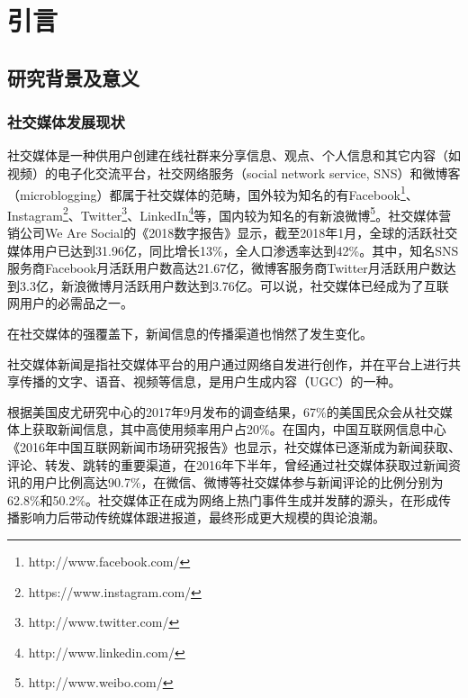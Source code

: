 \documentclass[a4paper,oneside,12pt]{book}
\begin{document}
  
\newpage

 
\newpage

\frontmatter\tableofcontents %

\newpage\mainmatter
{} %
\pagestyle{fancy} %


\chapter{引言}
\section{研究背景及意义}
\subsection{社交媒体发展现状}
社交媒体是一种供用户创建在线社群来分享信息、观点、个人信息和其它内容（如视频）的电子化交流平台，社交网络服务（social network service, SNS）和微博客（microblogging）都属于社交媒体的范畴\cite{webster_social_media}，国外较为知名的有Facebook\footnote{http://www.facebook.com/}、Instagram\footnote{https://www.instagram.com/}、Twitter\footnote{http://www.twitter.com/}、LinkedIn\footnote{http://www.linkedin.com/}等，国内较为知名的有新浪微博\footnote{http://www.weibo.com/}。社交媒体营销公司We Are Social的《2018数字报告》\cite{digital_in_2018}显示，截至2018年1月，全球的活跃社交媒体用户已达到31.96亿，同比增长13\%，全人口渗透率达到42\%。其中，知名SNS服务商Facebook月活跃用户数高达21.67亿，微博客服务商Twitter月活跃用户数达到3.3亿，新浪微博月活跃用户数达到3.76亿。可以说，社交媒体已经成为了互联网用户的必需品之一。

在社交媒体的强覆盖下，新闻信息的传播渠道也悄然了发生变化。

\begin{definition}
社交媒体新闻是指社交媒体平台的用户通过网络自发进行创作，并在平台上进行共享传播的文字、语音、视频等信息，是用户生成内容（UGC）的一种。\cite{周兴2017基于深度学习的谣言检测及模式挖掘}
\end{definition}

根据美国皮尤研究中心的2017年9月发布的调查结果\cite{pew_news_use_2017}，67\%的美国民众会从社交媒体上获取新闻信息，其中高使用频率用户占20\%。在国内，中国互联网信息中心《2016年中国互联网新闻市场研究报告》\cite{internet_news_2016}也显示，社交媒体已逐渐成为新闻获取、评论、转发、跳转的重要渠道，在2016年下半年，曾经通过社交媒体获取过新闻资讯的用户比例高达90.7\%，在微信、微博等社交媒体参与新闻评论的比例分别为62.8\%和50.2\%。社交媒体正在成为网络上热门事件生成并发酵的源头，在形成传播影响力后带动传统媒体跟进报道，最终形成更大规模的舆论浪潮。
\end{document}
